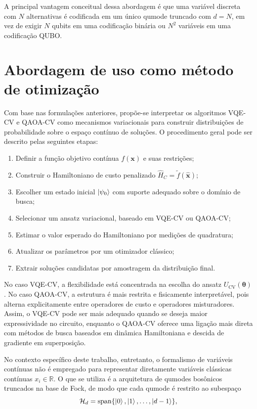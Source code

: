 A principal vantagem conceitual dessa abordagem é que uma variável discreta com $N$ alternativas é codificada em um único qumode truncado com $d=N$, em vez de exigir $N$ qubits em uma codificação binária ou $N^2$ variáveis em uma codificação QUBO.

\section{Abordagem de uso como método de otimização}
\label{sec:optimization_proposal}

Com base nas formulações anteriores, propõe-se interpretar os algoritmos VQE-CV e QAOA-CV como mecanismos variacionais para construir distribuições de probabilidade sobre o espaço contínuo de soluções. O procedimento geral pode ser descrito pelas seguintes etapas:

\begin{enumerate}
    \item Definir a função objetivo contínua $f(\mathbf{x})$ e suas 
    restrições;
    \item Construir o Hamiltoniano de custo penalizado 
    $\hat{H}_C = \widetilde{f}(\hat{\mathbf{x}})$;
    \item Escolher um estado inicial $\ket{\psi_0}$ com suporte adequado 
    sobre o domínio de busca;
    \item Selecionar um ansatz variacional, baseado em VQE-CV ou QAOA-CV;
    \item Estimar o valor esperado do Hamiltoniano por medições de 
    quadratura;
    \item Atualizar os parâmetros por um otimizador clássico;
    \item Extrair soluções candidatas por amostragem da distribuição 
    final.
\end{enumerate}

No caso VQE-CV, a flexibilidade está concentrada na escolha do ansatz $U_{\mathrm{CV}}(\boldsymbol{\theta})$. No caso QAOA-CV, a estrutura é mais restrita e fisicamente interpretável, pois alterna explicitamente entre operadores de custo e operadores misturadores. Assim, o VQE-CV pode ser mais adequado quando se deseja maior expressividade no circuito, enquanto o QAOA-CV oferece uma ligação mais direta com métodos de busca baseados em dinâmica Hamiltoniana e descida de gradiente em superposição.

No contexto específico deste trabalho, entretanto, o formalismo de variáveis contínuas não é empregado para representar diretamente variáveis clássicas contínuas $x_i \in \mathbb{R}$. O que se utiliza é a arquitetura de qumodes bosônicos truncados na base de Fock, de modo que cada qumode é restrito ao subespaço
\begin{equation}
    \mathcal{H}_{d}
    =
    \mathrm{span}\{
    \ket{0},\ket{1},\ldots,\ket{d-1}
    \},
\end{equation}

